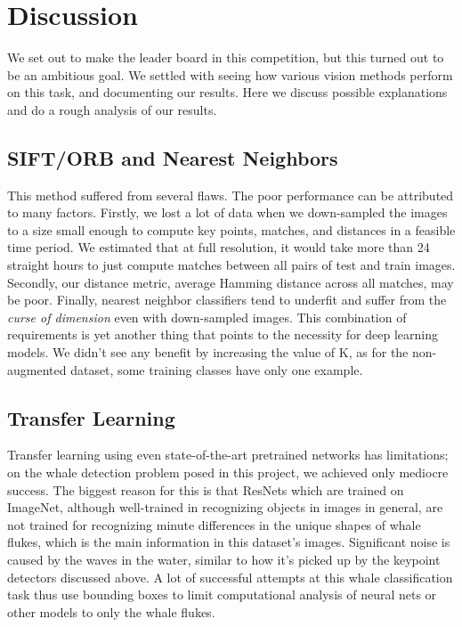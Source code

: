 \section{Discussion}

We set out to make the leader board in this competition, but this turned out to be an ambitious goal. We settled with seeing how various vision methods perform on this task, and documenting our results. Here we discuss possible explanations and do a rough analysis of our results. 

\subsection{SIFT/ORB and Nearest Neighbors}

This method suffered from several flaws. The poor performance can be attributed to many factors. Firstly, we lost a lot of data when we down-sampled the images to a size small enough to compute key points, matches, and distances in a feasible time period. We estimated that at full resolution, it would take more than 24 straight hours to just compute matches between all pairs of test and train images. Secondly, our distance metric, average Hamming distance across all matches, may be poor. Finally, nearest neighbor classifiers tend to underfit and suffer from the \textit{curse of dimension} even with down-sampled images. This combination of requirements is yet another thing that points to the necessity for deep learning models.
We didn't see any benefit by increasing the value of K, as for the non-augmented dataset, some training classes have only one example.

\subsection{Transfer Learning}

Transfer learning using even state-of-the-art pretrained networks has limitations; on the whale detection problem posed in this project, we achieved only mediocre success. The biggest reason for this is that ResNets which are trained on ImageNet, although well-trained in recognizing objects in images in general, are not trained for recognizing minute differences in the unique shapes of whale flukes, which is the main information in this dataset's images. Significant noise is caused by the waves in the water, similar to how it's picked up by the keypoint detectors discussed above. A lot of successful attempts at this whale classification task thus use bounding boxes to limit computational analysis of neural nets or other models to only the whale flukes.

